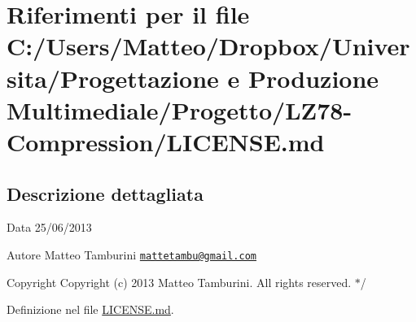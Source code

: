 \hypertarget{_l_i_c_e_n_s_e_8md}{\section{Riferimenti per il file C\-:/\-Users/\-Matteo/\-Dropbox/\-Universita/\-Progettazione e Produzione Multimediale/\-Progetto/\-L\-Z78-\/\-Compression/\-L\-I\-C\-E\-N\-S\-E.md}
\label{_l_i_c_e_n_s_e_8md}
}


\subsection{Descrizione dettagliata}
\begin{DoxyDate}{Data}
25/06/2013 
\end{DoxyDate}
\begin{DoxyAuthor}{Autore}
Matteo Tamburini \href{mailto:mattetambu@gmail.com}{\tt mattetambu@gmail.\-com} 
\end{DoxyAuthor}
\begin{DoxyCopyright}{Copyright}
Copyright (c) 2013 Matteo Tamburini. All rights reserved. $\ast$/ 
\end{DoxyCopyright}


Definizione nel file \hyperlink{_l_i_c_e_n_s_e_8md_source}{L\-I\-C\-E\-N\-S\-E.\-md}.

